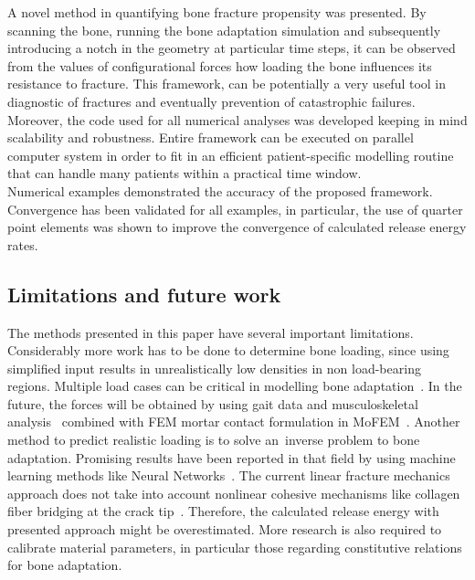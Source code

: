 \documentclass[review]{elsarticle}
\numberwithin{equation}{section}
\begin{document}
A novel method in quantifying bone fracture propensity was presented. By scanning the bone, running the bone adaptation simulation and subsequently introducing a notch in the geometry at particular time steps, it can be observed from the values of configurational forces how loading the bone influences its resistance to fracture. 
This framework, can be potentially a very useful tool in diagnostic of fractures and eventually prevention of catastrophic failures. 
Moreover, the code used for all numerical analyses was developed keeping in mind scalability and robustness. 
Entire framework can be executed on parallel computer system in order to fit in an efficient patient-specific modelling routine that can handle many patients within a practical time window. \\

Numerical examples demonstrated the accuracy of the proposed framework. 
Convergence has been validated for all examples, in particular, the use of quarter point elements was shown to improve the convergence of calculated release energy rates. 
\subsection{Limitations and future work}
The methods presented in this paper have several important limitations. 
Considerably more work has to be done to determine bone loading, since using simplified input results in unrealistically low densities in non load-bearing regions. 
Multiple load cases can be critical in modelling bone adaptation~\citep{geraldes2016consideration}. 
In the future, the forces will be obtained by using gait data and musculoskeletal analysis~\citep{Delp2007} combined with FEM mortar contact formulation in MoFEM~\citep{athanasiadis2018mortar}. 
Another method to predict realistic loading is to solve an~inverse problem to bone adaptation. 
Promising results have been reported in that field by using machine learning methods like Neural Networks~\citep{campoli2012computational}. 
The current linear fracture mechanics approach does not take into account nonlinear cohesive mechanisms like collagen fiber bridging at the crack tip~\citep{yang2006fracture}. 
Therefore, the calculated release energy with presented approach might be overestimated. 
More research is also required to calibrate material parameters, in particular those regarding constitutive relations for bone adaptation. 


\end{document}
